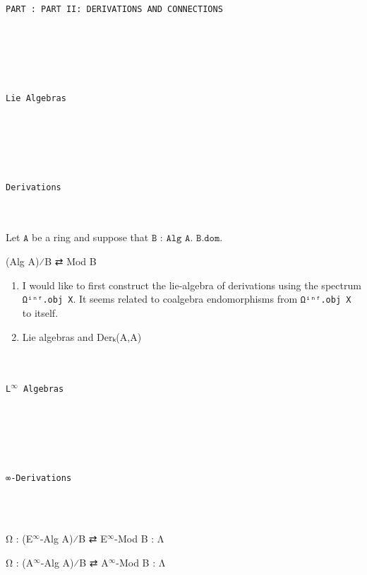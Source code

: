 \documentclass{book}
\theoremstyle{definition}
\newcounter{pcounter}
\renewcommand{\chapter}[1]{
\newpage
{
\Huge 
\begin{center}
\ \\
\ \\
\thispagestyle{empty}
\texttt{#1}
\end{center}}
\ \\
\ \\
}
\newcounter{partcount}
\renewcommand{\part}[1]{
\newpage
{
\Huge 
\begin{center}
\ \\
\ \\
\ \\
\ \\
\ \\
\ \\
\thispagestyle{empty}
\texttt{PART {\thepartcount}: #1}
\stepcounter{partcount}
\end{center}}
\ \\
\ \\
}
\begin{document}
\part{PART II: DERIVATIONS AND CONNECTIONS}


\newpage
\chapter{Lie Algebras}




\newpage
\chapter{Derivations}

Let $\texttt{A}$ be a ring and suppose that $\texttt{B : Alg A}$. $\texttt{B.dom}$.\\

\begin{center}
(Alg A)⁄B ⇄ Mod B
\end{center}

\begin{enumerate}
\item I would like to first construct the lie-algebra of derivations using the spectrum \texttt{Ωⁱⁿᶠ.obj X}. It seems related to coalgebra endomorphisms from \texttt{Ωⁱⁿᶠ.obj X} to itself.
\item Lie algebras and Derₖ(A,A)
\end{enumerate}


\newpage
\chapter{L${}^{\infty}$ Algebras}




\newpage
\chapter{∞-Derivations}

\begin{center}
Ω : (E${}^{\infty}$-Alg A)⁄B ⇄ E${}^{\infty}$-Mod B : Λ
\end{center}

\begin{center}
Ω : (A${}^{\infty}$-Alg A)⁄B ⇄ A${}^{\infty}$-Mod B : Λ
\end{center}
\end{document}
